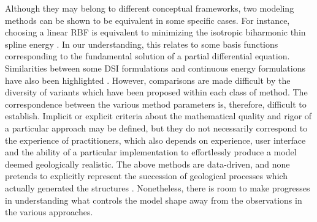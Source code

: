 \documentclass[preprint]{ring20}
\begin{document}
Although they may belong to different conceptual frameworks, two modeling methods can be shown to be equivalent in some specific cases. For instance, choosing a linear RBF is equivalent to minimizing the isotropic biharmonic thin spline energy \citep{Carr2001}. In our understanding, this relates to some basis functions corresponding to the fundamental solution of a partial differential equation. Similarities between some DSI formulations and continuous energy formulations have also been highlighted \citep{Renaudeau2019MG,Irakarama2022CD}. However, comparisons are made difficult by the diversity of variants which have been proposed within each class of method. The correspondence between the various method parameters is, therefore, difficult to establish. Implicit or explicit criteria about the mathematical quality and rigor of a particular approach may be defined, but they do not necessarily correspond to the experience of practitioners, which also depends on experience, user interface and the ability of a particular implementation to effortlessly produce a model deemed geologically realistic. The above methods are data-driven, and none pretends to explicitly represent the succession of geological processes which actually generated the structures \citep{Caumon2010MG,Jessell2010T}. Nonetheless, there is room to make progresses in understanding what controls the model shape away from the observations in the various approaches. %

\end{document}

